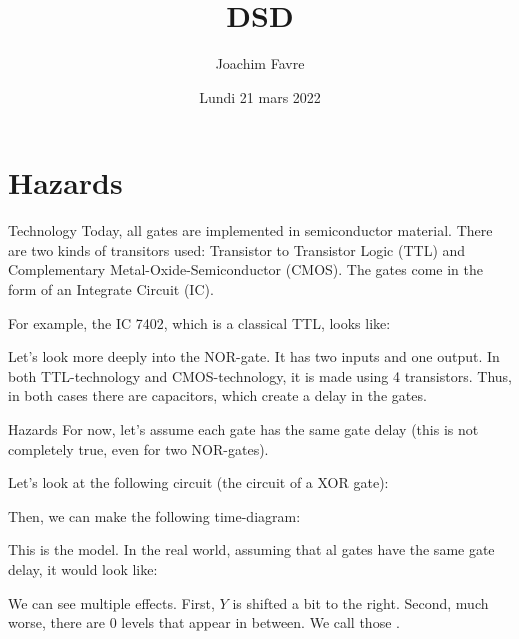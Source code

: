 \documentclass[a4paper]{article}
\title{DSD}
\author{Joachim Favre}
\date{Lundi 21 mars 2022}
\begin{document}
\maketitle


\section{Hazards}
\begin{parag}{Technology}
    Today, all gates are implemented in semiconductor material. There are two kinds of transitors used: Transistor to Transistor Logic (TTL) and Complementary Metal-Oxide-Semiconductor (CMOS). The gates come in the form of an Integrate Circuit (IC).

    For example, the IC 7402, which is a classical TTL, looks like:

    Let's look more deeply into the NOR-gate. It has two inputs and one output. In both TTL-technology and CMOS-technology, it is made using 4 transistors. Thus, in both cases there are capacitors, which create a delay in the gates. 
\end{parag}

\begin{parag}{Hazards}
    For now, let's assume each gate has the same gate delay (this is not completely true, even for two NOR-gates).

    Let's look at the following circuit (the circuit of a XOR gate):

    Then, we can make the following time-diagram:

    This is the  model. In the real world, assuming that al gates have the same gate delay, it would look like:

    We can see multiple effects. First, $Y$ is shifted a bit to the right. Second, much worse, there are 0 levels that appear in between. We call those .
\end{parag}
\end{document}
